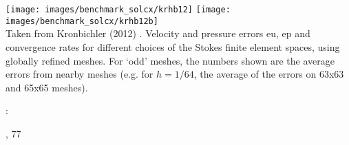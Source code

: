 \begin{center}
\texttt{[image: images/benchmark\_solcx/krhb12]}
\texttt{[image: images/benchmark\_solcx/krhb12b]}\\
{\captionfont Taken from Kronbichler \etal (2012) \cite{krhb12}.
Velocity and pressure errors eu, ep and convergence rates for different choices of 
the Stokes finite element spaces, using globally refined meshes. 
For ‘odd’ meshes, the numbers shown are the average errors from nearby meshes 
(e.g. for $h=1/64$, the average of the errors on 63x63 and 65x65 meshes).}
\end{center}


\Literature: \cite{mamo08,vemmXX,demh19} 

, 77



